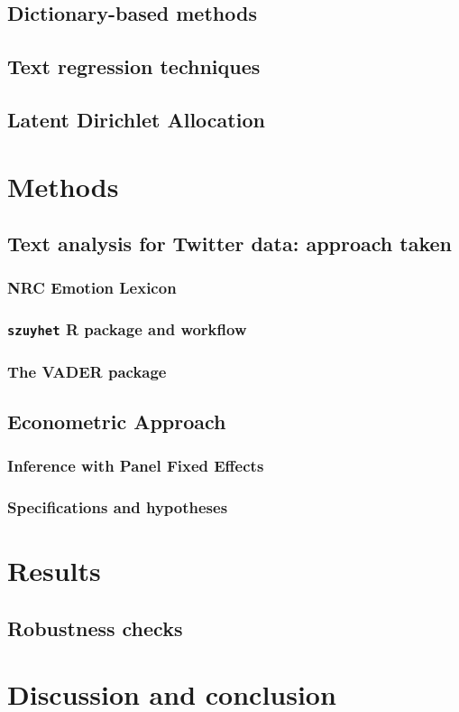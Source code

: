 \documentclass{article}
\begin{document}
\subsection{Dictionary-based methods}
\subsection{Text regression techniques}
\subsection{Latent Dirichlet Allocation}

\section{Methods}
\subsection{Text analysis for Twitter data: approach taken}
\subsubsection{NRC Emotion Lexicon}
\subsubsection{\texttt{szuyhet} R package and workflow}
\subsubsection{The VADER package}

\subsection{Econometric Approach}
\subsubsection{Inference with Panel Fixed Effects}
\subsubsection{Specifications and hypotheses}

\section{Results}%

\subsection{Robustness checks}

\section{Discussion and conclusion} %


\printbibliography
\end{document}
